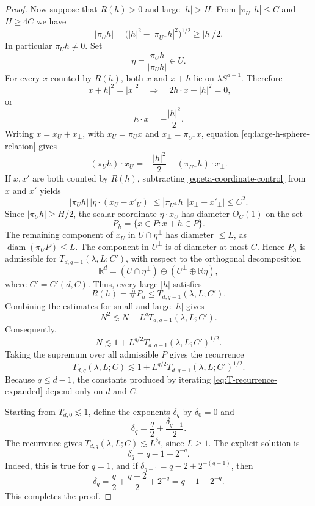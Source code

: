 \documentclass[11pt,reqno]{amsart}
\numberwithin{equation}{section}
\newcommand{\1}{\textbf{1}}
\newcommand{\ls}{\lesssim}
\newcommand{\R}{\mathbb R}
\begin{document}
\begin{proof}
		Now suppose that $R(h)>0$ and large $|h|>H$.  From
		$|\pi_{U^\perp}h|\le C$ and $H\ge4C$ we have
		\[
		|\pi_Uh|
		=\bigl(|h|^2-|\pi_{U^\perp}h|^2\bigr)^{1/2}
		\ge |h|/2.
		\]
		In particular $\pi_Uh\ne0$.  Set
		\[
		\eta=\frac{\pi_Uh}{|\pi_Uh|}\in U.
		\]
		For every $x$ counted by $R(h)$, both $x$ and $x+h$ lie on
		$\lambda S^{d-1}$. Therefore
		\[
		|x+h|^2=|x|^2
		\quad\Longrightarrow\quad
		2h\cdot x+|h|^2=0,
		\]
		or
		\begin{equation}\label{eq:large-h-sphere-relation}
			h\cdot x=-\frac{|h|^2}{2}.
		\end{equation}
		Writing $x=x_U+x_\perp$, with $x_U=\pi_Ux$ and
		$x_\perp=\pi_{U^\perp}x$, equation
		\eqref{eq:large-h-sphere-relation} gives
		\begin{equation}\label{eq:eta-coordinate-control}
			(\pi_Uh)\cdot x_U
			=-\frac{|h|^2}{2}-(\pi_{U^\perp}h)\cdot x_\perp.
		\end{equation}
		If $x,x'$ are both counted by $R(h)$, subtracting
		\eqref{eq:eta-coordinate-control} from $x$ and $x'$ yields
		\[
		|\pi_Uh|\,|\eta\cdot(x_U-x'_U)|
		\le |\pi_{U^\perp}h|\,|x_\perp-x'_\perp|
		\le C^2.
		\]
		Since $|\pi_Uh|\ge H/2$, the scalar coordinate
		$\eta\cdot x_U$ has diameter $O_C(1)$ on the set
		\[
		P_h=\{x\in P:x+h\in P\}.
		\]
		The remaining component of $x_U$ in $U\cap\eta^\perp$ has diameter
		$\le L$, as $\operatorname{diam}(\pi_UP)\le L$.  The component in
		$U^\perp$ is of diameter at most $C$.  Hence $P_h$ is admissible for
		$T_{d,q-1}(\lambda,L;C')$, with respect to the orthogonal decomposition
		\[
		\R^d=(U\cap\eta^\perp)\oplus (U^\perp\oplus\R\eta),
		\]
		where $C'=C'(d,C)$. Thus, every large  $|h|$ satisfies
		\[
		R(h)=\#P_h\le T_{d,q-1}(\lambda,L;C').
		\]
		Combining the estimates for small and large $|h|$ gives
		\[
		N^2
		\ls N+L^qT_{d,q-1}(\lambda,L;C').
		\]
		Consequently,
		\[
		N\ls1+L^{q/2}T_{d,q-1}(\lambda,L;C')^{1/2}.
		\]
		Taking the supremum over all admissible $P$ gives the recurrence
		\begin{equation}\label{eq:T-recurrence-expanded}
			T_{d,q}(\lambda,L;C)
			\ls1+L^{q/2}T_{d,q-1}(\lambda,L;C')^{1/2}.
		\end{equation}
		Because $q\le d-1$, the constants produced by iterating
		\eqref{eq:T-recurrence-expanded} depend only on $d$ and $C$.
		
		Starting from $T_{d,0}\ls1$, define the exponents $\delta_q$ by
		$\delta_0=0$ and
		\[
		\delta_q=\frac q2+\frac{\delta_{q-1}}2.
		\]
		The recurrence gives $T_{d,q}(\lambda,L;C)\ls L^{\delta_q}$, since
		$L\ge1$.  The explicit solution is
		\[
		\delta_q=q-1+2^{-q}.
		\]
		Indeed, this is true for $q=1$, and if
		$\delta_{q-1}=q-2+2^{-(q-1)}$, then
		\[
		\delta_q=\frac q2+\frac{q-2}{2}+2^{-q}=q-1+2^{-q}.
		\]
		This completes the proof.
	\end{proof}
\end{document}
